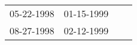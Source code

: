 \begin{supertabular}{llll}
 05-22-1998 &  01-15-1999 \\
 08-27-1998 &  02-12-1999 \\
\end{supertabular}
